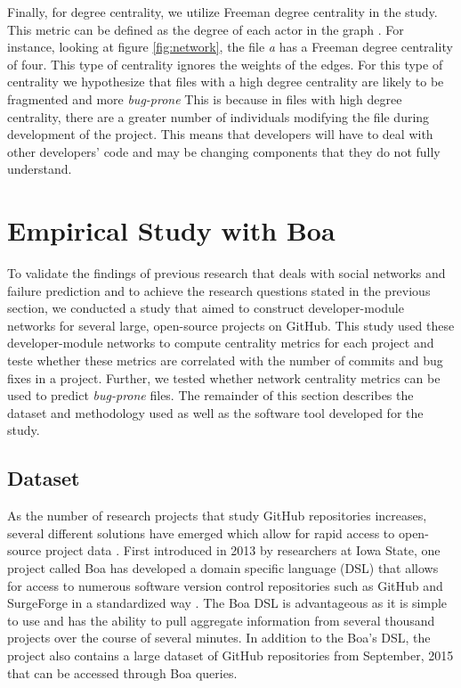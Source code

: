 \documentclass{sig-alternate-05-2015}
\begin{document}
Finally, for degree centrality, we utilize Freeman degree centrality in the study. This metric can be defined as the degree of each actor in the graph \cite{hanneman:network_methods}. For instance, looking at figure \ref{fig:network}, the file \textit{a} has a Freeman degree centrality of four. This type of centrality ignores the weights of the edges. For this type of centrality we hypothesize that files with a high degree centrality are likely to be fragmented and more \textit{bug-prone} This is because in files with high degree centrality, there are a greater number of individuals modifying the file during development of the project. This means that developers will have to deal with other developers' code and may be changing components that they do not fully understand.
 
\section{Empirical Study with Boa}
\label{study}
To validate the findings of previous research that deals with social networks and failure prediction \cite{pingzer:networks} and to achieve the research questions stated in the previous section, we conducted a study that aimed to construct developer-module networks for several large, open-source projects on GitHub. This study used these developer-module networks to compute centrality metrics for each project and teste whether these metrics are correlated with the number of commits and bug fixes in a project. Further, we tested whether network centrality metrics can be used to predict \textit{bug-prone} files. The remainder of this section describes the dataset and methodology used as well as the software tool developed for the study.

\subsection{Dataset}
As the number of research projects that study GitHub repositories increases, several different solutions have emerged which allow for rapid access to open-source project data \cite{Kalliamvakou:GitHub}. First introduced in 2013 by researchers at Iowa State, one project called Boa has developed a domain specific language (DSL) that allows for access to numerous software version control repositories such as GitHub and SurgeForge in a standardized way \cite{Dyer:Boa}. The  Boa DSL is advantageous as it is simple to use and has the ability to pull aggregate information from several thousand projects over the course of several minutes. In addition to the Boa's DSL, the project also contains a large dataset of GitHub repositories from September, 2015 that can be accessed through Boa queries. 
\end{document}
